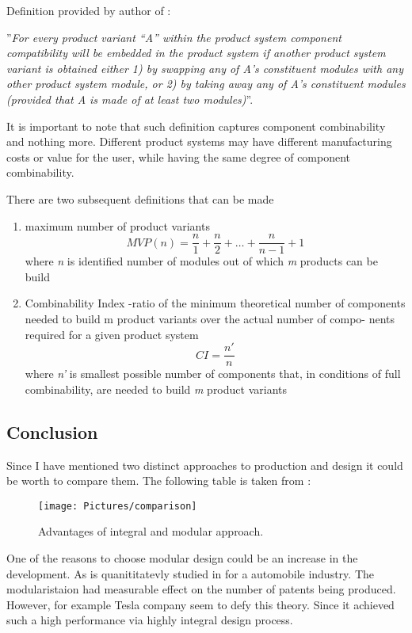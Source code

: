 \documentclass[]{scrartcl}
\begin{document}
Definition provided by author of \cite{Salvador2007}:

''\emph{For every product variant “A” within the product system component compatibility will be embedded in the product system if another product system variant is obtained either 1) by swapping any of A’s constituent modules with any other product system module, or 2) by taking away any of A’s constituent modules (provided that A is made of at least two modules)}''.

It is important to note that such definition captures component combinability and nothing more. Different product systems may have different manufacturing costs or value for the user, while having the same degree of component combinability.

There are two subsequent definitions that can be made
\begin{enumerate}
	\item maximum number of product variants
	\subitem
	\begin{equation}
	MVP(n) = \frac{n}{1} + \frac{n}{2}+\ldots+\frac{n}{n-1}+1
	\end{equation}
	where \emph{n} is identified number of modules out of which \emph{m} products can be build
	\item Combinability Index -ratio of the minimum theoretical number of components needed to build m product variants over the actual number of compo- nents required for a given product system
	\subitem 
	\begin{equation}
	CI = \frac{n'}{n}
	\end{equation}
	where \emph{n'} is smallest possible number of components that, in conditions of full combinability, are needed to build \emph{m} product variants
\end{enumerate}


\subsection{Conclusion}

Since I have mentioned two distinct approaches to production and design it could be worth to compare them. The following table is taken from \cite{JulianaHsuanMikkola2003}:
\begin{figure}[h!]
	\centering
	\texttt{[image: Pictures/comparison]}
	\caption{Advantages of integral and modular approach.}
	\label{fig:comparison}
\end{figure}


One of the reasons to choose modular design could be an increase in the development. As is quanititatevly studied in \cite{Wang2010} for a automobile industry. The modularistaion had measurable effect on the number of patents being produced. However, for example Tesla company seem to defy this theory. Since it achieved such a high performance via highly integral design process. 
\end{document}
